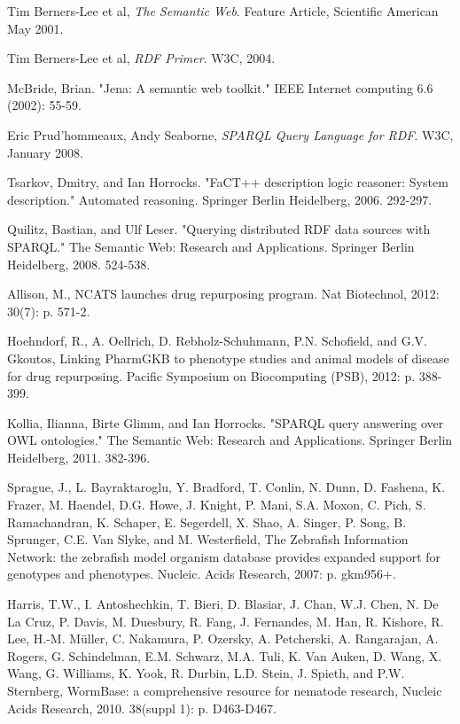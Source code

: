 \documentclass{article}
\begin{document}
\begin{thebibliography}{9}

  Tim Berners-Lee et al,
  \emph{The Semantic Web}.
  Feature Article, Scientific American
  May 2001.

 Tim Berners-Lee et al,
 \emph{RDF Primer}.
 W3C,
 2004.

  McBride, Brian.
  "Jena: A semantic web toolkit." 
  IEEE Internet computing 6.6
  (2002): 55-59.

  Eric Prud'hommeaux, Andy Seaborne,
  \emph{SPARQL Query Language for RDF}.
  W3C,
  January 2008.

  Tsarkov, Dmitry, and Ian Horrocks. "FaCT++ description logic reasoner: System description." Automated reasoning. Springer Berlin Heidelberg, 2006. 292-297.

  Quilitz, Bastian, and Ulf Leser. 
  "Querying distributed RDF data sources with SPARQL." 
  The Semantic Web: Research and Applications. 
  Springer Berlin Heidelberg, 
  2008. 524-538.

  Allison, M., NCATS launches drug repurposing program.
  Nat Biotechnol,
  2012: 30(7): p. 571-2.
  
  Hoehndorf, R., A. Oellrich, D. Rebholz-Schuhmann, P.N. Schofield, and G.V. Gkoutos,
  Linking PharmGKB to phenotype studies and animal models of disease for drug repurposing. 
  Pacific Symposium on Biocomputing (PSB), 
  2012: p. 388-399.

  Kollia, Ilianna, Birte Glimm, and Ian Horrocks. "SPARQL query answering over
  OWL ontologies." The Semantic Web: Research and Applications. Springer Berlin
  Heidelberg, 2011. 382-396.

  Sprague, J., L. Bayraktaroglu, Y. Bradford, T. Conlin, N. Dunn, D. Fashena, K. Frazer, M. Haendel, D.G. Howe, J. Knight, P. Mani, S.A. Moxon, C. Pich, S. Ramachandran, K. Schaper, E. Segerdell, X. Shao, A. Singer, P. Song, B. Sprunger, C.E. Van Slyke, and M. Westerfield, 
  The Zebrafish Information Network: the zebrafish model organism database provides expanded support for genotypes and phenotypes. 
  Nucleic. Acids Research,
  2007: p. gkm956+.

  Harris, T.W., I. Antoshechkin, T. Bieri, D. Blasiar, J. Chan, W.J. Chen, N. De La Cruz, P. Davis, M. Duesbury, R. Fang, J. Fernandes, M. Han, R. Kishore, R. Lee, H.-M. M\"uller, C. Nakamura, P. Ozersky, A. Petcherski, A. Rangarajan, A. Rogers, G. Schindelman, E.M. Schwarz, M.A. Tuli, K. Van Auken, D. Wang, X. Wang, G. Williams, K. Yook, R. Durbin, L.D. Stein, J. Spieth, and P.W. Sternberg, 
  WormBase: a comprehensive resource for nematode research,
  Nucleic Acids Research,
  2010. 38(suppl 1): p. D463-D467.


\end{thebibliography}
\end{document}
